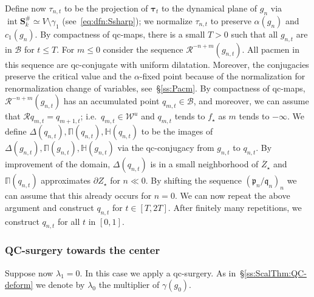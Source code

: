 \documentclass[]{amsart}
\newcommand{\bDelta}{{\mathbb{\Delta}}}
\newcommand{\bPi}{{\mathbb{\Pi}}}
\newcommand\RR{\mathcal{R}}
\newcommand\intr{\operatorname{int}}
\newcommand{\bS}{{\mathbf S}}
\newcommand{\fH}{{\mathbb H}}
\newcommand{\btau}{{ \boldsymbol {\tau}}}%
\newcommand{\str}{{\star}}
\newcommand{\pp}{\mathfrak{p}}
\renewcommand{\qq}{\mathfrak{q}}
\newcommand\WW{\mathcal{W}}
\newcommand\BB{\mathcal{B}}
\theoremstyle{remark}
\numberwithin{equation}{section}
\theoremstyle{definition}
\begin{document}
Define now $\tau_{n,t}$ to be the projection of $\btau_t$ to the dynamical plane of $g_n$ via $\intr \bS^{\#}_{k} \simeq V\setminus \gamma_1$ (see~\eqref{eq:dfn:Ssharp}); we normalize $\tau_{n,t}$ to preserve $\alpha(g_n)$ and $c_1(g_n)$. By compactness of qc-maps, there is a small $T>0$ such that all $g_{n,t}$ are in $\BB$ for $t\le T$. For $m\le0$ consider the sequence $\RR^{-n+m}(g_{n,t})$. All pacmen in this sequence are qc-conjugate with uniform dilatation. Moreover, the conjugacies preserve the critical value and the $\alpha$-fixed point because of the normalization for renormalization change of variables, see~\S\ref{ss:Pacm}. By compactness of qc-maps, $\RR^{-n+m}(g_{n,t})$ has an accumulated point $q_{m,t}\in \BB$, and moreover, we can assume that $\RR q_{m,t}=q_{m+1,t}$; i.e.~$q_{m,t}\in \WW^u$ and $q_{m,t}$ tends to $f_\str$ as $m$ tends to $-\infty$. We define $\bDelta(q_{n,t}),\bPi(q_{n,t}), \fH(q_{n,t})$ to be the images of  $\bDelta(g_{n,t}),\bPi(g_{n,t}), \fH(g_{n,t})$ via the qc-conjugacy from $g_{n,t}$ to $q_{n,t}$. By improvement of the domain, $\bDelta(q_{n,t})$ is in a small neighborhood of $\overline Z_\str$ and $\bPi(q_{n,t})$ approximates $\partial Z_\str$ for $n\ll0$. By shifting the sequence $(\pp_n/\qq_n)_n$ we can assume that this already occurs for $n=0$. We can now repeat the above argument and construct $q_{n,t}$ for $t\in [T,2T]$. After finitely many repetitions, we construct $q_{n,t}$ for all $t$ in $[0,1]$.


 \subsubsection{QC-surgery towards the center}
 \label{ss:ScalThm:QC-surj}
Suppose now $\lambda_1=0$.  In this case we apply a qc-surgery. As in~\S\ref{ss:ScalThm:QC-deform} we denote by  $\lambda_0$ the multiplier of $ \gamma(g_0)$. 
 
\end{document}
